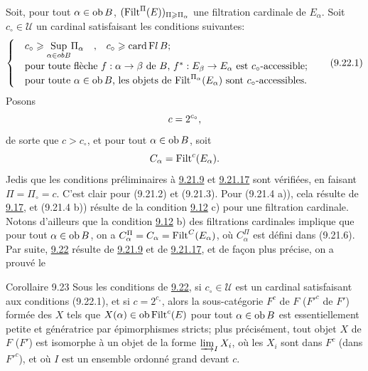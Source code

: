 \documentclass[10pt]{../fichiers-configuration-latex/smfart}
\begin{document}
Soit, pour tout $\alpha\in \operatorname{ob} B$, $(\operatorname{Filt}^{\Pi}(E))_{\Pi\geqslant
\Pi_{\alpha}}$ une filtration cardinale de $E_{\alpha}$. Soit
$c_{\circ}\in 𝒰$ un cardinal satisfaisant les conditions
suivantes:
\begin{equation}
\begin{cases}
& c_{\circ}\geq {\displaystyle{\mathop{\Sup}_{\alpha\in ob
B}}}\Pi_{\alpha}{\quav} c_{\circ}\geq \card %
\mathrm{F}{}l\, B;\\
& \mbox{pour toute flèche $f:\alpha\rightarrow \beta$ de $B$,
$f^\ast:E_{\beta}\rightarrow E_{\alpha}$ est
$c_{\circ}$-accessible;}\\
& \mbox{pour toute $\alpha\in \ob B$, les objets de
$\Filt^{\Pi_{\alpha}}(E_{\alpha})$ sont $c_\circ$-accessibles.}
\end{cases}\tag{9.22.1}
\end{equation}
Posons
$$
c=2^{c_{\circ}}{},
$$
de sorte que $c>c_{\circ}$, et pour tout $\alpha\in \operatorname{ob} B$, soit
$$
C_{\alpha}=\operatorname{Filt}^c(E_{\alpha}){}.
$$
Je\pageoriginale dis que les conditions préliminaires à
\hyperref[I.lem9.21.9]{9.21.9} et
\hyperref[I.lem9.21.17]{9.21.17} sont vérifiées, en faisant
$\Pi=\Pi_{\circ}=c$. C'est clair
pour (9.21.2) et (9.21.3). Pour (9.21.4 a)),
cela résulte de \hyperref[I.cor9.17]{9.17},
et (9.21.4 b)) résulte de la condition \hyperref[I.def9.12]{9.12} c)
pour une filtration
cardinale. Notons d'ailleurs que la condition \hyperref[I.def9.12]{9.12} b) des
filtrations cardinales implique que pour tout $\alpha\in \operatorname{ob} B$, on
a $C^{\Pi}_{\alpha}=C_{\alpha}=\operatorname{Filt}^C(E_{\alpha})$, où
$C^{\Pi}_{\alpha}$ est défini dans (9.21.6). Par suite,
\hyperref[I.them9.22]{9.22} résulte
de \hyperref[I.lem9.21.9]{9.21.9} et de \hyperref[I.lem9.21.17]{9.21.17}, et de façon plus
précise, on a prouvé le

\begin{enonce*}{Corollaire 9.23}
Sous les conditions de \hyperref[I.them9.22]{9.22}, si $c_{\circ}\in 𝒰$ est un
cardinal satisfaisant aux conditions
(9.22.1), et si $c=2^{c_{\circ}}$, alors la sous-catégorie $F^c$ de
$F$ (\resp ${F'}^c$ de $F'$) formée des $X$ tels que $X(\alpha)\in
\operatorname{ob} \operatorname{Filt}^c(E)$ pour tout $\alpha\in \operatorname{ob} B$ est essentiellement
petite et génératrice par épimorphismes stricts; plus précisément,
tout objet $X$ de $F$ (\resp $F'$) est isomorphe à un objet de la
forme $\varinjlim_I X_i$, où les $X_i$ sont dans $F^c$ (\resp dans
${F'}^c$), et où $I$ est un ensemble ordonné grand devant $c$.
\end{enonce*}
\end{document}
